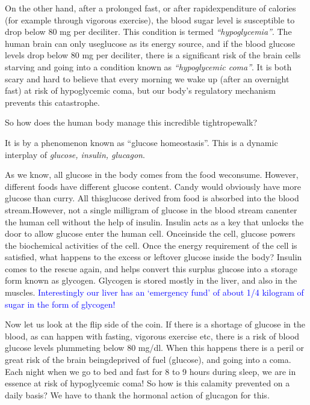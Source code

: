 On the other hand, after a prolonged fast, or after rapid\break expenditure of calories (for example through vigorous exercise), the blood sugar level is susceptible to drop below 80 mg per deciliter. This condi\-tion is termed \textit{“hypoglycemia”}. The human brain can only use\break glucose as its energy source, and if the blood glucose levels drop below 80 mg per deciliter, there is a significant risk of the brain cells star\-ving and going into a condition known as \textit{“hypoglycemic coma”}. It is both scary and hard to believe that every morning we wake up (after an overnight fast) at risk of hypoglycemic coma, but our body’s regulatory mechanism prevents this catastrophe.



So how does the human body manage this incredible tightrope\break walk?



It is by a phenomenon known as “glucose homeostasis”. This is a dynamic interplay of \textit{glucose, insulin, glucagon}.



As we know, all glucose in the body comes from the food we\break consume. However, different foods have different glucose content. Candy would obviously have more glucose than curry. All this\break glucose derived from food is absorbed into the blood stream.\break However, not a single milligram of glucose in the blood stream can\break enter the human cell without the help of insulin. Insulin acts as a key that unlocks the door to allow glucose enter the human cell. Once\break inside the cell, glucose powers the biochemical activities of the cell. Once the energy requirement of the cell is satisfied, what happens to the excess or leftover glucose inside the body? Insulin comes to the rescue again, and helps convert this surplus glucose into a storage form known as glycogen. Glycogen is stored mostly in the liver, and also in the muscles. \textcolor{blue}{Interestingly our liver has an ‘emergency fund’ of about 1/4 kilogram of sugar in the form of glycogen!}

Now let us look at the flip side of the coin. If there is a shortage of glucose in the blood, as can happen with fasting, vigorous exercise etc, there is a risk of blood glucose levels plummeting below 80 mg/dl. When this happens there is a peril or great risk of the brain being\break deprived of fuel (glucose), and going into a coma. Each night when we go to bed and fast for 8 to 9 hours during sleep, we are in essence at risk of hypoglycemic coma! So how is this calamity prevented on a daily basis? We have to thank the hormonal action of glucagon for this.

